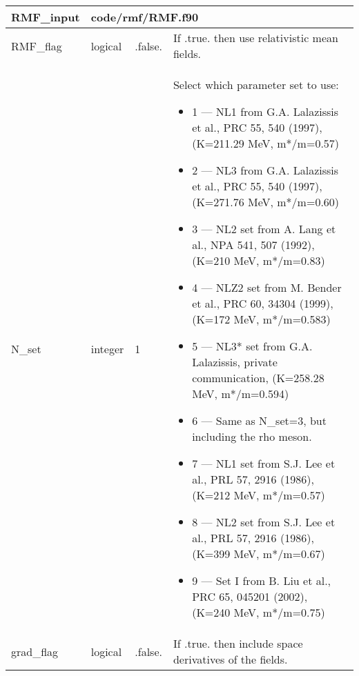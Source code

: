 \documentclass{article}
\begin{document}
\begin{longtable}{llll}
\toprule
\textbf{\large{RMF\_input}} & \multicolumn{3}{l}{\footnotesize{code/rmf/RMF.f90}}\\*
\midrule
\endfirsthead
\midrule
\endhead
RMF\_flag & \begin{minipage}[t]{2cm}logical\end{minipage} & \begin{minipage}[t]{2cm}.false.\end{minipage} & \begin{minipage}[t]{12cm}If .true. then use relativistic mean fields.\end{minipage}\\*
\midrule
N\_set & \begin{minipage}[t]{2cm}integer\end{minipage} & \begin{minipage}[t]{2cm}1\end{minipage} & \begin{minipage}[t]{12cm}Select which parameter set to use:\begin{itemize}\leftmargin0em\itemindent0pt\item 1 --- NL1 from G.A. Lalazissis et al., PRC 55, 540 (1997),  (K=211.29 MeV, m*/m=0.57)\item 2 --- NL3 from G.A. Lalazissis et al., PRC 55, 540 (1997),  (K=271.76 MeV, m*/m=0.60)\item 3 --- NL2 set from A. Lang et al., NPA 541, 507 (1992),     (K=210 MeV,    m*/m=0.83)\item 4 --- NLZ2 set from M. Bender et al., PRC 60, 34304 (1999), (K=172 MeV,    m*/m=0.583)\item 5 --- NL3* set from G.A. Lalazissis, private communication, (K=258.28 MeV, m*/m=0.594)\item 6 --- Same as N\_set=3, but including the rho meson.\item 7 --- NL1 set from S.J. Lee et al., PRL 57, 2916 (1986),    (K=212 MeV,    m*/m=0.57)\item 8 --- NL2 set from S.J. Lee et al., PRL 57, 2916 (1986),    (K=399 MeV,    m*/m=0.67)\item 9 --- Set I from B. Liu et al., PRC 65, 045201 (2002),      (K=240 MeV,    m*/m=0.75)\end{itemize}\end{minipage}\\*
\midrule
grad\_flag & \begin{minipage}[t]{2cm}logical\end{minipage} & \begin{minipage}[t]{2cm}.false.\end{minipage} & \begin{minipage}[t]{12cm}If .true. then include space derivatives of the fields.\end{minipage}\\*

\end{longtable}
\end{document}
